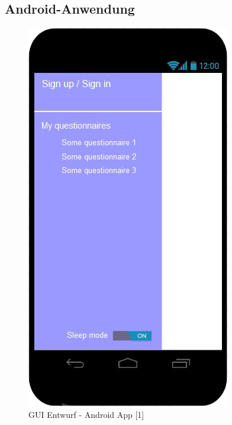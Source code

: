\documentclass[a4paper]{scrreprt}
\begin{document}
        \newpage
        \subsection{Android-Anwendung}
            \vspace*{1cm}
	        \begin{figure}[ht]
                \centering
                \includegraphics[scale = 0.3]{android1.jpg}
                \caption{GUI Entwurf - Android App [1]}
            \end{figure}
	
\end{document}
